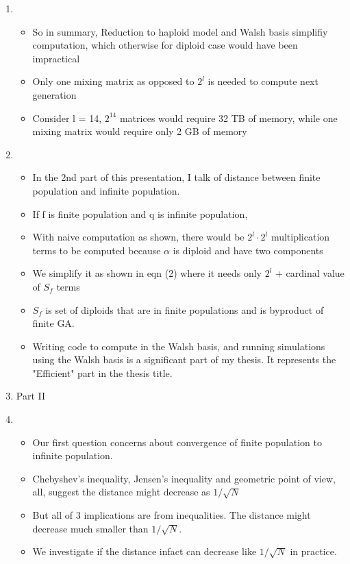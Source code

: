 \documentclass{article}
\begin{document}
\begin{enumerate}
\item
  \begin{itemize}
  
  \item So in summary, Reduction to haploid model and Walsh basis simplifiy computation, which otherwise for diploid case would have been impractical
  \item Only one mixing matrix as opposed to $2^l$ is needed to compute next generation
  \item Consider l = 14, $2^{14}$ matrices would require 32 TB of
    memory, while one mixing matrix would require only 2 GB of memory
  
  \end{itemize}
    
\item
  \begin{itemize}
  \item In the 2nd part of this presentation, I talk of distance between finite population and infinite population.
  \item If f is finite population and q is infinite population,
  \item With naive computation as shown, there would
    be $2^l \cdot 2^l$ multiplication terms to be computed because $\alpha$ is diploid and have two components  
  \item We simplify it as shown in eqn (2) where it needs only $2^l$ +
    cardinal value of $S_f$ terms
  \item $S_f$ is set of diploids that are in finite populations and is byproduct of finite GA.
  
  \item Writing code to compute in the Walsh basis, and running simulations using the Walsh basis 
  is a significant part of my thesis. It represents the "Efficient" part in the thesis title.
  \end{itemize}
  
\item {Part II}
  
\item
  \begin{itemize}
  \item Our first question concerns about convergence of finite population to infinite population.
  \item Chebyshev's inequality, Jensen's inequality and geometric point of view, all, suggest the distance might decrease
    as $1/\sqrt{ N}$
  \item But all of 3 implications are from inequalities. The distance
    might decrease much smaller than $1/\sqrt{ N}$.
  \item We investigate if the distance infact can decrease like $1/\sqrt{N}$ in practice. 
  \end{itemize}
  

\end{enumerate}
\end{document}

